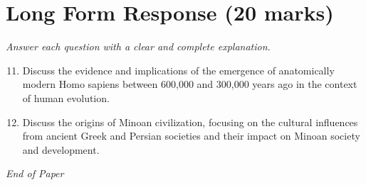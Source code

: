 \documentclass[12pt]{article}
\begin{document}
\section*{Long Form Response (20 marks)}
\textit{Answer each question with a clear and complete explanation.}
\begin{enumerate}[label=\arabic*.]
\setcounter{enumi}{10}
\item Discuss the evidence and implications of the emergence of anatomically modern Homo sapiens
between 600,000 and 300,000 years ago in the context of human evolution.
\item Discuss the origins of Minoan civilization, focusing on the cultural influences from
ancient Greek and Persian societies and their impact on Minoan society and development.
\end{enumerate}

\vfill
\noindent\textit{End of Paper}
\end{document}
